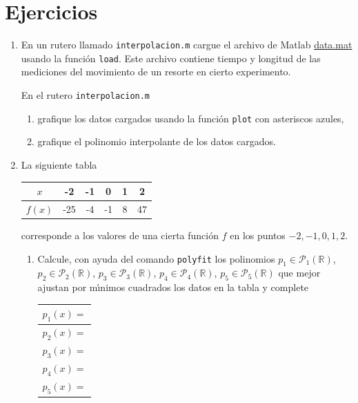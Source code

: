 \documentclass[letterpaper,11pt]{article}
\newcommand{\matlab}{{\sc Matlab} }
\begin{document}
\section{Ejercicios}
\begin{enumerate}
\item 
En un rutero llamado \texttt{interpolacion.m} cargue el archivo de \matlab
\href{ftp://ftp.ing-mat.udec.cl/pub/ing-mat/asignaturas/521230/ejercicios/2018-1/data.mat}{data.mat}
usando la funci\'on \texttt{load}. Este archivo contiene tiempo y longitud de las mediciones del movimiento de un resorte en cierto experimento.

En el rutero \texttt{interpolacion.m}
\begin{enumerate}
\item grafique los datos cargados usando la funci\'on \texttt{plot} con asteriscos azules,
\item grafique el polinomio interpolante de los datos cargados.
\end{enumerate}

\item La siguiente tabla
\begin{center}
\begin{tabular}{c|ccccc}
$x$ & -2 & -1 &  0  & 1 &  2\\\hline
$f(x)$& -25 & -4 & -1 & 8 & 47
\end{tabular}
\end{center}
corresponde a los valores de una cierta funci\'on $f$ en los puntos $-2,-1,0,1,2$.
\begin{enumerate}
\item Calcule, con ayuda del comando \texttt{polyfit} los polinomios $p_1 \in \mathcal{P}_1(\mathbb{R})$,
$p_2 \in {\mathcal P}_2(\mathbb{R})$, $p_3 \in {\mathcal P}_3(\mathbb{R})$, $p_4 \in {\mathcal P}_4(\mathbb{R})$, $p_5 \in {\mathcal P}_5(\mathbb{R})$
que mejor ajustan por m\'{\i}nimos 	cuadrados los datos en la tabla y complete

\begin{center}
\begin{tabular}{|c|}\hline
$p_1(x)=$ \hspace*{8cm}\\\hline	
$p_2(x)=$ \hspace*{8cm}\\\hline
$p_3(x)=$ \hspace*{8cm}\\\hline
$p_4(x)=$ \hspace*{8cm}\\\hline
$p_5(x)=$ \hspace*{8cm}\\\hline
\end{tabular}
\end{center}


\end{enumerate}
\end{enumerate}
\end{document}
